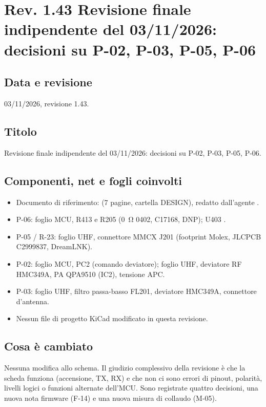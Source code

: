\clearpage
\section[Rev. 1.43 -- Revisione finale indipendente: P-02, P-03, P-05, P-06]{Rev. 1.43 \textendash{} Revisione finale indipendente del 03/11/2026: decisioni su P-02, P-03, P-05, P-06}

\subsection{Data e revisione}
03/11/2026, revisione 1.43.

\subsection{Titolo}
Revisione finale indipendente del 03/11/2026: decisioni su P-02, P-03, P-05, P-06.

\subsection{Componenti, net e fogli coinvolti}
\begin{itemize}
\item Documento di riferimento:  (7 pagine, cartella DESIGN), redatto dall'agente .
\item P-06: foglio MCU, R413 e R205 (\SI{0}{\ohm} 0402, C17168, DNP); U403 .
\item P-05 / R-23: foglio UHF, connettore MMCX J201 (footprint Molex, JLCPCB C2999837, DreamLNK).
\item P-02: foglio MCU, PC2 (comando deviatore); foglio UHF, deviatore RF HMC349A, PA QPA9510 (IC2), tensione APC.
\item P-03: foglio UHF, filtro passa-basso FL201, deviatore HMC349A, connettore d'antenna.
\item Nessun file di progetto KiCad modificato in questa revisione.
\end{itemize}

\subsection{Cosa è cambiato}
Nessuna modifica allo schema. Il giudizio complessivo della revisione è che la scheda funziona (accensione, TX, RX) e che non ci sono errori di pinout, polarità, livelli logici o funzioni alternate dell'MCU. Sono registrate quattro decisioni, una nuova nota firmware (F-14) e una nuova misura di collaudo (M-05).

